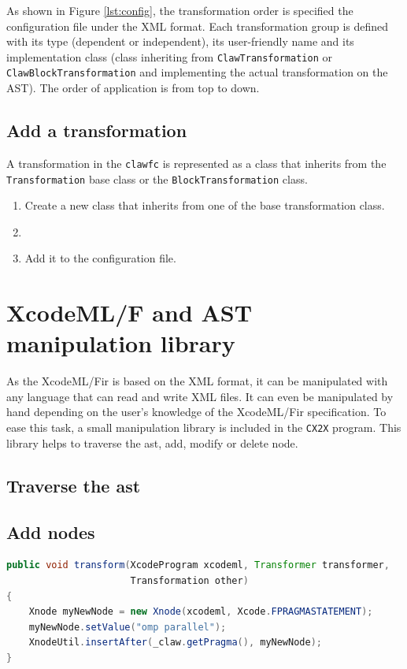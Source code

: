 \documentclass[a4paper, 11pt]{report}
\def\xcodeml{XcodeML/F\xspace}
\def\clawfc{\lstinline!clawfc!\xspace}
\def\cx2x{\lstinline!CX2X!\xspace}
\begin{document}
As shown in Figure \ref{lst:config}, the transformation order is specified the
configuration file under the XML format.
Each transformation group is defined with its type (dependent or 
independent), its user-friendly name and its implementation class (class 
inheriting from \lstinline|ClawTransformation| or 
\lstinline|ClawBlockTransformation| and implementing the actual transformation
on the AST). The order of application is from top to down.


\section{Add a transformation}
A transformation in the \clawfc is represented as a class that inherits from 
the \lstinline|Transformation| base class or the 
\lstinline|BlockTransformation| class.

\begin{enumerate}
\item Create a new class that inherits from one of the base transformation 
class.
\item %
\item Add it to the configuration file.
\end{enumerate}

\chapter{\xcodeml and AST manipulation library}
\label{chapter:astmanip}
As the \xcodeml \gls{ir} is based on the XML format, it can be manipulated with
any language that can read and write XML files. It can even be manipulated by 
hand depending on the user's knowledge of the \xcodeml \gls{ir} specification. 
To ease this task, a small manipulation library is included in the \cx2x 
program. This library helps to traverse the \gls{ast}, add, modify or delete 
node.

\section{Traverse the \gls{ast}}

\section{Add nodes}

\begin{lstlisting}[label=lst:add_node, language=Java, caption=XcodeML/F add node example]
public void transform(XcodeProgram xcodeml, Transformer transformer,
                      Transformation other)
{                      
    Xnode myNewNode = new Xnode(xcodeml, Xcode.FPRAGMASTATEMENT);
    myNewNode.setValue("omp parallel");
    XnodeUtil.insertAfter(_claw.getPragma(), myNewNode);
}
\end{lstlisting}
\end{document}
